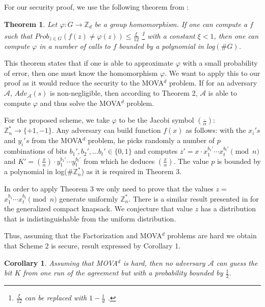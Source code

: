\documentclass[11pt, a4paper, twoside, openright]{report}
\newtheorem{theorem}{Theorem}
\newtheorem{corollary}{Corollary}
\begin{document}
			For our security proof, we use the following theorem from \cite{mova} :
			
			\begin{theorem} 
				Let $\varphi: G  \rightarrow \mathbb{Z}_d$ be a group homomorphism. If one can compute a $f$ such that 
				$Prob_{z \in G}(f(z) \not= \varphi(z)) \leq \frac{\xi}{12}$ \footnote{$\frac{\xi}{12}$ can be replaced with $1- \frac{1}{d}$ \cite{mova}.} with a constant $\xi < 1$, then one can compute
				$\varphi$ in a number of calls to $f$ bounded by a polynomial in log$(\# G)$. 
			\end{theorem} 
			
			This theorem states that if one is able to approximate $\varphi$ with a small probability of error, then 
			one must know the homomorphism $\varphi$. We want to apply this to our proof as it would reduce the security to the 
			MOVA$^d$ problem. If for an adversary $\mathcal{A}$, $Adv_{\mathcal{A}}(s)$ is non-negligible, then according to 
			Theorem 2, $\mathcal{A}$ is able to compute $\varphi$ and thus solve the MOVA$^d$ problem. 
			
			For the proposed scheme, we take $\varphi$ to be the Jacobi symbol $(\frac{.}{\alpha})$: $\mathbb{Z}_n^* \rightarrow \{+1,-1\}$. 
			Any adversary can build function $f(x)$ as follows: with the $x_i's$ and $y_i's$ from the MOVA$^d$ problem, he picks randomly 
			a number of $p$ combinations of bits $b_1', b_2', \ldots b_t' \in \{0,1\}$ and computes 
			$z'= x \cdot x_1^{b_1'} \cdots x_t^{b_t'} \pmod{n}$ and $K' = (\frac{x}{\alpha}) \cdot y_1^{b_1'} \cdots y_t^{b_t'}$ from which he deduces $(\frac{x}{\alpha})$. The value $p$
			is bounded by a polynomial in log($\# \mathbb{Z}_n^*$) as it is required in Theorem 3. 
			 
			In order to apply Theorem 3 we only need to prove that the values $z=$$x_1^{b_1} \cdots x_t^{b_t} \pmod{n}$ generate uniformly $\mathbb{Z}_n^*$. 
			There is a similar result presented in \cite{knapsack} for the generalized compact knapsack. We conjecture that value $z$ has a distribution
			that is indistinguishable from the uniform distribution.    
			
			Thus, assuming that the Factorization and MOVA$^d$ problems are hard we obtain that Scheme 2 is secure, result expressed by Corollary 1.
			 
			\begin{corollary}
				Assuming that MOVA$^d$ is hard, then no adversary $\mathcal{A}$ can guess the bit $K$ from one run of the agreement but with a probability bounded by 
				$\frac{1}{2}$. 	
			\end{corollary}
\end{document}
